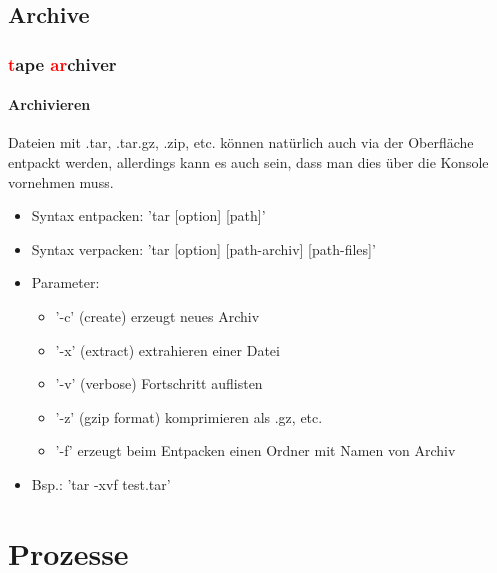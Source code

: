 \documentclass[12pt,utf8, handout]{beamer}
\begin{document}
\subsection{Archive}
\begin{frame}
\frametitle{\textcolor{red}{t}ape \textcolor{red}{ar}chiver}
\framesubtitle{Archivieren}
Dateien mit .tar, .tar.gz, .zip, etc. können natürlich auch via der Oberfläche entpackt werden, allerdings kann es auch sein, dass man dies über die Konsole vornehmen muss.
\begin{itemize}[<+->]
	\item Syntax entpacken: 'tar [option] [path]'
	\item Syntax verpacken: 'tar [option] [path-archiv] [path-files]'
	\item Parameter:
	\begin{itemize}[<+->]
		\item '-c' (create) erzeugt neues Archiv
		\item '-x' (extract) extrahieren einer Datei
		\item '-v' (verbose) Fortschritt auflisten
		\item '-z' (gzip format) komprimieren als .gz, etc.
		\item '-f' erzeugt beim Entpacken einen Ordner mit Namen von Archiv
	\end{itemize}
	\item Bsp.: 'tar -xvf test.tar'
\end{itemize}
\end{frame}

\section{Prozesse}
\end{document}
